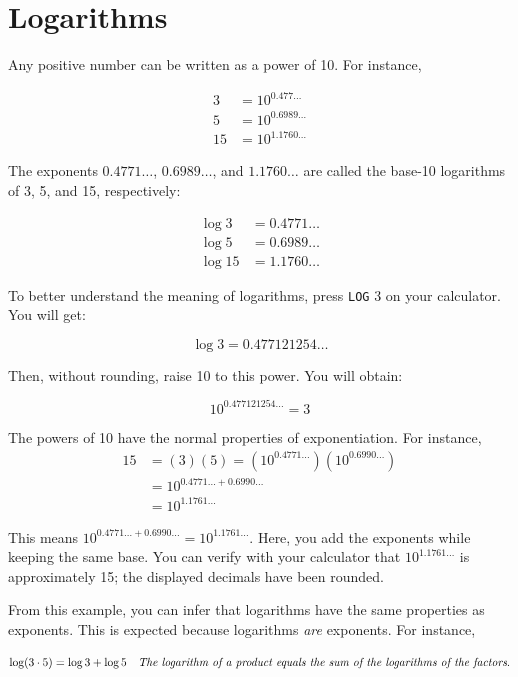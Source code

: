 \section{Logarithms}
Any positive number can be written as a power of 10. For instance,

\[
\begin{aligned}
3 & = 10^{0.477 \ldots} \\
5 & = 10^{0.6989 \ldots} \\
15 & = 10^{1.1760 \ldots}
\end{aligned}
\]

The exponents \(0.4771 \ldots\), \(0.6989 \ldots\), and \(1.1760 \ldots\) are called the base-10 logarithms of 3, 5, and 15, respectively:

\[
\begin{aligned}
\log 3 & = 0.4771 \ldots \\
\log 5 & = 0.6989 \ldots \\
\log 15 & = 1.1760 \ldots
\end{aligned}
\]

To better understand the meaning of logarithms, press \texttt{LOG} 3 on your calculator. You will get:

\[
\log 3 = 0.477121254 \ldots
\]

Then, without rounding, raise 10 to this power. You will obtain:

\[
10^{0.477121254 \ldots} = 3
\]

The powers of 10 have the normal properties of exponentiation. For instance,
\[
\begin{aligned}
15 & = (3)(5) = \left(10^{0.4771 \ldots}\right)\left(10^{0.6990 \ldots}\right) \\
& = 10^{0.4771 \ldots + 0.6990 \ldots} \\
& = 10^{1.1761 \ldots}
\end{aligned}
\]

This means \(10^{0.4771 \ldots + 0.6990 \ldots} = 10^{1.1761 \ldots}\). Here, you add the exponents while keeping the same base. You can verify with your calculator that \(10^{1.1761 \ldots}\) is approximately 15; the displayed decimals have been rounded.

From this example, you can infer that logarithms have the same properties as exponents. This is expected because logarithms \textit{are} exponents. For instance,

\[
\log(3 \cdot 5) = \log 3 + \log 5 \quad \text{\textit{The logarithm of a product equals the sum of the logarithms of the factors}.}
\]

